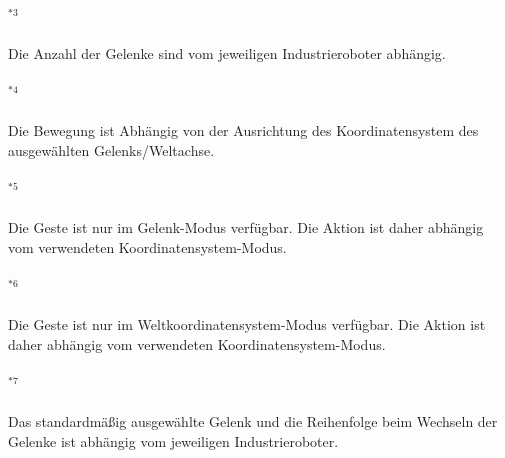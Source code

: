 \paragraph*{$^{\ast3}$}\label{ast:gesten_anmerkung_3}\small{Die Anzahl der Gelenke sind vom jeweiligen Industrieroboter abhängig.}\vspace{-0.75em}
\paragraph*{$^{\ast4}$}\label{ast:gesten_anmerkung_4}\small{Die Bewegung ist Abhängig von der Ausrichtung des Koordinatensystem des ausgewählten Gelenks/Weltachse.}\vspace{-0.75em}
\paragraph*{$^{\ast5}$}\label{ast:gesten_anmerkung_5}\small{Die Geste ist nur im Gelenk-Modus verfügbar. Die Aktion ist daher abhängig vom verwendeten Koordinatensystem-Modus.}\vspace{-0.75em}
\paragraph*{$^{\ast6}$}\label{ast:gesten_anmerkung_6}\small{Die Geste ist nur im Weltkoordinatensystem-Modus verfügbar. Die Aktion ist daher abhängig vom verwendeten Koordinatensystem-Modus.}\vspace{-0.75em}
\paragraph*{$^{\ast7}$}\label{ast:gesten_anmerkung_7}\small{Das standardmäßig ausgewählte Gelenk und die Reihenfolge beim Wechseln der Gelenke ist abhängig vom jeweiligen Industrieroboter.}\vspace{-0.75em}
\newline\newline

